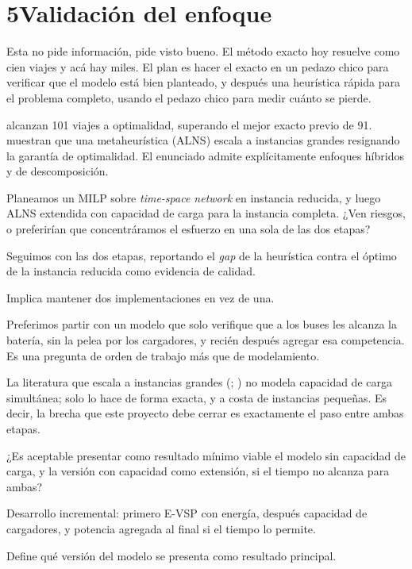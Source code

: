 \documentclass[11pt,a4paper,parskip=half]{scrartcl}
\begin{document}
\section*{5\quad Validación del enfoque}

\begin{campos}
\item[En simple] Esta no pide información, pide visto bueno. El método exacto hoy resuelve como cien viajes y acá hay miles. El plan es hacer el exacto en un pedazo chico para verificar que el modelo está bien planteado, y después una heurística rápida para el problema completo, usando el pedazo chico para medir cuánto se pierde.
\item[Evidencia] \citet{wu_waitingtimebranchprice_2025} alcanzan 101 viajes a optimalidad, superando el mejor exacto previo de 91. \citet{wen_alnsevsp_2016} muestran que una metaheurística (ALNS) escala a instancias grandes resignando la garantía de optimalidad. El enunciado admite explícitamente enfoques híbridos y de descomposición.
\item[Pregunta] Planeamos un MILP sobre \textit{time-space network} en instancia reducida, y luego ALNS extendida con capacidad de carga para la instancia completa. ¿Ven riesgos, o preferirían que concentráramos el esfuerzo en una sola de las dos etapas?
\item[Supuesto] Seguimos con las dos etapas, reportando el \textit{gap} de la heurística contra el óptimo de la instancia reducida como evidencia de calidad.
\item[Impacto] Implica mantener dos implementaciones en vez de una.
\end{campos}

\begin{campos}
\item[En simple] Preferimos partir con un modelo que solo verifique que a los buses les alcanza la batería, sin la pelea por los cargadores, y recién después agregar esa competencia. Es una pregunta de orden de trabajo más que de modelamiento.
\item[Evidencia] La literatura que escala a instancias grandes (\citet{wen_alnsevsp_2016}; \citet{adler_altfuelvsp_2017}) no modela capacidad de carga simultánea; solo \citet{devos_capacitatedcharging_2024} lo hace de forma exacta, y a costa de instancias pequeñas. Es decir, la brecha que este proyecto debe cerrar es exactamente el paso entre ambas etapas.
\item[Pregunta] ¿Es aceptable presentar como resultado mínimo viable el modelo sin capacidad de carga, y la versión con capacidad como extensión, si el tiempo no alcanza para ambas?
\item[Supuesto] Desarrollo incremental: primero E-VSP con energía, después capacidad de cargadores, y potencia agregada al final si el tiempo lo permite.
\item[Impacto] Define qué versión del modelo se presenta como resultado principal.
\end{campos}
\end{document}
